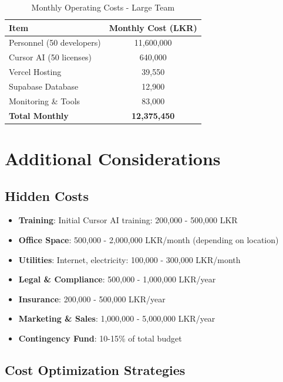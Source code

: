 \documentclass[12pt,a4paper]{article}
\begin{document}
\begin{table}[H]
\centering
\begin{tabular}{|l|c|}
\hline
\textbf{Item} & \textbf{Monthly Cost (LKR)} \\
\hline
Personnel (50 developers) & 11,600,000 \\
Cursor AI (50 licenses) & 640,000 \\
Vercel Hosting & 39,550 \\
Supabase Database & 12,900 \\
Monitoring \& Tools & 83,000 \\
\hline
\textbf{Total Monthly} & \textbf{12,375,450} \\
\hline
\end{tabular}
\caption{Monthly Operating Costs - Large Team}
\end{table}

\section{Additional Considerations}

\subsection{Hidden Costs}

\begin{itemize}
    \item \textbf{Training}: Initial Cursor AI training: 200,000 - 500,000 LKR
    \item \textbf{Office Space}: 500,000 - 2,000,000 LKR/month (depending on location)
    \item \textbf{Utilities}: Internet, electricity: 100,000 - 300,000 LKR/month
    \item \textbf{Legal \& Compliance}: 500,000 - 1,000,000 LKR/year
    \item \textbf{Insurance}: 200,000 - 500,000 LKR/year
    \item \textbf{Marketing \& Sales}: 1,000,000 - 5,000,000 LKR/year
    \item \textbf{Contingency Fund}: 10-15\% of total budget
\end{itemize}

\subsection{Cost Optimization Strategies}
\end{document}
